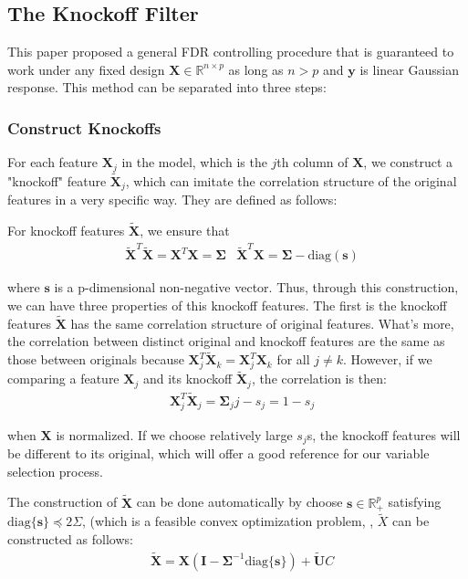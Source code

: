 \documentclass{uwstat572}
\newcommand\diag{\text{diag}}
\begin{document}
\subsection{The Knockoff Filter}
This paper proposed a general FDR controlling procedure that is guaranteed to work under any fixed design $\bm{X} \in \mathbb{R}^{n\times p}$ as long as $n>p$ and $\bm{y}$ is linear Gaussian response. This method can be separated into three steps:

\subsubsection{Construct Knockoffs}
For each feature $\bm{X}_j$ in the model, which is the $j$th column of $\bm{X}$, we construct a "knockoff" feature $\bm{\tilde X}_j$, which can imitate the correlation structure of the original features in a very specific way. They are defined as follows:

For knockoff features $\tilde {\bm{X}}$, we ensure that 
\begin{align}
& \tilde {\bm{X}}^T\tilde {\bm{X}} = \bm{X}^T\bm{X} = \bm{\Sigma} & \tilde {\bm{X}}^T\bm{X} = \bm{\Sigma} - \text{diag}{(\bm{s})}
\end{align}

where $\bm{s}$ is a p-dimensional non-negative vector. Thus, through this construction, we can have three properties of this knockoff features. The first is the knockoff features $\bm{\tilde{X}}$ has the same correlation structure of original features. What's more, the correlation between distinct original and knockoff features are the same as those between originals because $\bm{X}_j^T\tilde{\bm{X}}_k = \bm{X}_j^T\bm{X}_k$ for all $j\neq k$. However, if we comparing a feature $\bm{X}_j$ and its knockoff $\bm{\tilde X}_j$, the correlation is then:
\begin{align*}
& \bm{X}_j^T\tilde{\bm{X}}_j = \bm{\Sigma}_jj - s_j = 1-s_j
\end{align*}

when $\bm{X}$ is normalized. If we choose relatively large $s_j$s, the knockoff features will be different to its original, which will offer a good reference for our variable selection process. 

The construction of $\bm{\tilde X}$ can be done automatically by choose $\bm{s}\in\mathbb{R}_+^p$ satisfying $\diag\{\bm{s} \}\preceq 2\Sigma$, (which is a feasible convex optimization problem, \cite{boyd2004convex}, $\tilde{X}$ can be constructed as follows:
\begin{align}\label{eq:5}
& \tilde{\bm{X}} = \bm{X}(\bm{I}- \bm{\Sigma}^{-1}\text{diag}\{\bm{s} \}) + \bm{\tilde U}C 
\end{align}
\end{document}
